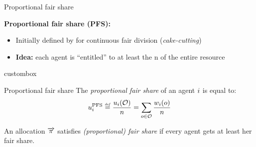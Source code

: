 \documentclass[9pt,english]{beamer}
\newcommand{\fup}[1]{\raisebox{0.5em}{\scriptsize #1}}
\begin{document}
\begin{frame}{Proportional fair share}
  \begin{bibunit}[apalike]
    \textbf{Proportional fair share (PFS):}
    \begin{itemize}
    \item Initially defined by \cite{Steinhaus48} for continuous fair
      division (\textit{cake-cutting})
    \item \textbf{Idea:} each agent is ``entitled'' to at least the
      n\fup{th} of the entire resource
    \end{itemize}
    \vfill

    \begin{beamercolorbox}[wd=\textwidth,sep=1ex]{custombox}%
    \end{beamercolorbox}
    
    \pause\vfill
  
    \begin{block}{Proportional fair share}
      The \emph{proportional fair share} of an agent $i$ is equal
      to:
      \[
      \uPFS_\ag \Def \frac{u_i(\Objets)}{\maxAgents} = \sum_{\ob \in \Objets} \frac{w_i(\ob)}{\maxAgents}
      \]

      An allocation $\overrightarrow{\pi}$ satisfies \emph{(proportional) fair
        share} if every agent gets at least her fair share.
    \end{block}
  \end{bibunit}
\end{frame}  
\end{document}
